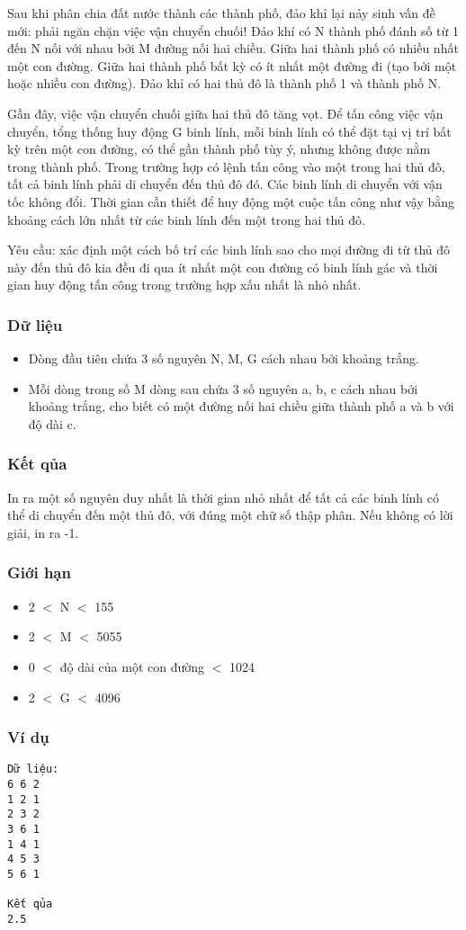 



   Sau khi phân chia đất nước thành các thành phố, đảo khỉ lại nảy sinh vấn đề mới: phải ngăn chặn việc vận chuyển chuối! Đảo khí có N thành phố đánh số từ 1 đến N nối với nhau bởi M đường nối hai   chiều. Giữa hai thành phố có nhiều nhất một con đường. Giữa hai thành phố bất kỳ có ít nhất một đường đi (tạo bởi một hoặc nhiều con đường). Đảo khỉ có hai thủ đô là thành phố 1 và thành phố N.  

   Gần đây, việc vận chuyển chuối giữa hai thủ đô tăng vọt. Để tấn công việc vận chuyển, tổng thống huy động G binh lính, mỗi binh lính có thể đặt tại vị trí bất kỳ trên một con đường, có thể gần thành phố   tùy ý, nhưng không được nằm trong thành phố. Trong trường hợp có lệnh tấn công vào một trong hai thủ đô, tất cả binh lính phải di chuyển đến thủ đô đó. Các binh lính di chuyển với vận tốc không đổi. Thời   gian cần thiết để huy động một cuộc tấn công như vậy bằng khoảng cách lớn nhất từ các binh lính đến một trong hai thủ đô.  

   Yêu cầu: xác định một cách bố trí các binh lính sao cho mọi đường đi từ thủ đô này đến thủ đô kia đều đi qua ít nhất một con đường có binh lính gác và thời gian huy động tấn công trong trường hợp xấu   nhất là nhỏ nhất.  

\subsubsection{   Dữ liệu  }
\begin{itemize}
	\item     Dòng đầu tiên chứa 3 số nguyên N, M, G cách nhau bởi khoảng trắng.   
	\item     Mỗi dòng trong số M dòng sau chứa 3 số nguyên a, b, c cách nhau bởi khoảng trắng, cho biết có một đường nối hai chiều giữa thành phố a và b với độ dài c.   
\end{itemize}

\subsubsection{   Kết qủa  }

   In ra một số nguyên duy nhất là thời gian nhỏ nhất để tất cả các binh lính có thể di chuyển đến một thủ đô, với đúng một chữ số thập phân. Nếu không có lời giải, in ra -1.  

\subsubsection{   Giới hạn  }
\begin{itemize}
	\item     2 $<$ N $<$ 155   
	\item     2 $<$ M $<$ 5055   
	\item     0 $<$ độ dài của một con đường $<$ 1024   
	\item     2 $<$ G $<$ 4096   
\end{itemize}

\subsubsection{   Ví dụ  }
\begin{verbatim}
Dữ liệu:
6 6 2
1 2 1
2 3 2
3 6 1
1 4 1
4 5 3
5 6 1

Kết qủa
2.5
\end{verbatim}